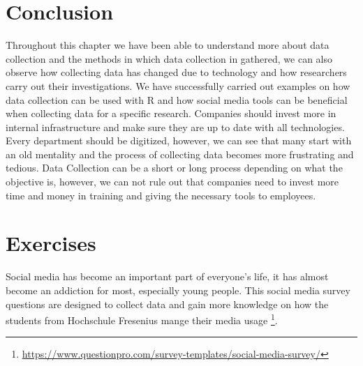 \section{Conclusion}
 
Throughout this chapter we have been able to understand more about data collection and the methods in which data collection in gathered, we can also observe how collecting data has changed due to technology and how researchers carry out their investigations. We have successfully carried out examples on how data collection can be used with R and how social media tools can be beneficial when collecting data for a specific research. Companies should invest more in internal infrastructure and make sure they are up to date with all technologies. Every department should be digitized, however, we can see that many start with an old mentality and the process of collecting data becomes more frustrating and tedious. Data Collection can be a short or long process depending on what the objective is, however, we can not rule out that companies need to invest more time and money in training and giving the necessary tools to employees.




\section{Exercises}

Social media has become an important part of everyone’s life, it has almost become an addiction for most, especially young people. This social media survey questions are designed to collect data and gain more knowledge on how the students from Hochschule Fresenius mange their media usage \footnote{\href{https://www.questionpro.com/survey-templates/social-media-survey/}{https://www.questionpro.com/survey-templates/social-media-survey/}}.

